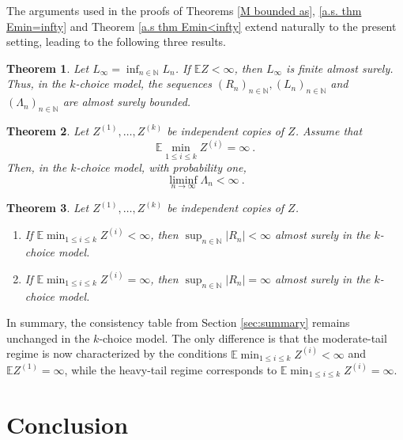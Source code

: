 \documentclass[12pt]{article}
\newcommand{\N}{\mathbb{N}}
\newcommand{\E}{\mathbb{E}}
\newtheorem{theorem}{Theorem}
\numberwithin{equation}{section} \font\titre=cmbx12
\newcommand{\Lset}{\mathcal{L}} %
\newcommand{\leftmost}{L}
\newcommand{\rightmost}{R}
\newcommand{\leaves}{\Lambda}
\begin{document}
The arguments used in the proofs of Theorems \ref{M bounded as}, \ref{a.s. thm Emin=infty} and Theorem \ref{a.s thm Emin<infty} extend naturally to the present setting, leading to the following three results.

\begin{theorem}
Let $\leftmost_\infty=\inf_{n\in \N} \leftmost_n$. If $\E Z < \infty$, then $\leftmost_\infty$ is finite almost surely.
Thus, in the $k$-choice model, the sequences $(\rightmost_n)_{n\in\N},(\leftmost_n)_{n\in\N}$ and $(\leaves_n)_{n\in\N}$ are almost surely bounded.
\end{theorem}

\begin{theorem}
    Let $Z^{(1)},\dots, Z^{(k)}$ be independent copies of $Z$. Assume that $$\E \min_{1\le i \le k} Z^{(i)} = \infty~.$$ Then, in the $k$-choice model, with probability one,
  $$
  \liminf_{n\to \infty} \leaves_n < \infty~.
  $$
  \end{theorem}

\begin{theorem}
    Let $Z^{(1)},\dots, Z^{(k)}$ be independent copies of $Z$. 
    \begin{enumerate}%
        \item If $\E \min_{1\le i \le k} Z^{(i)}<\infty$, then $\sup_{n\in\N} |\rightmost_n| < \infty$  almost surely in the $k$-choice model.
        \item If $\E \min_{1\le i \le k} Z^{(i)} = \infty$, then $\sup_{n\in\N} |\rightmost_n| = \infty$ almost surely in the $k$-choice model.
    \end{enumerate}
\end{theorem}

In summary, the consistency table from Section \ref{sec:summary} remains unchanged in the $k$-choice model. The only difference is that the moderate-tail regime is now characterized by the conditions $\E \min_{1 \le i \le k} Z^{(i)} < \infty$ and $\E Z^{(1)} = \infty$, while the heavy-tail regime corresponds to $\E \min_{1 \le i \le k} Z^{(i)} = \infty$.

\color{black}

\section{Conclusion}
\end{document}
